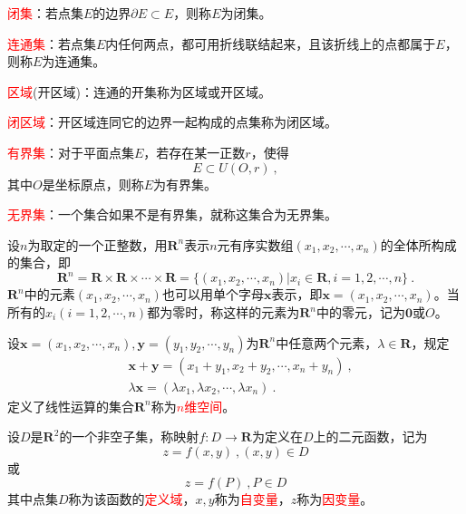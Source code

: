 \documentclass[12pt,a4paper]{article}
\renewcommand{\vec}[1]{\boldsymbol{#1}}
\begin{document}
\textcolor{red}{闭集}：若点集$E$的边界$\partial E \subset E$，则称$E$为闭集。

\textcolor{red}{连通集}：若点集$E$内任何两点，都可用折线联结起来，且该折线上的点都属于$E$，则称$E$为连通集。


\textcolor{red}{区域}(开区域)：连通的开集称为区域或开区域。

\textcolor{red}{闭区域}：开区域连同它的边界一起构成的点集称为闭区域。

\textcolor{red}{有界集}：对于平面点集$E$，若存在某一正数$r$，使得
\begin{equation*}
E \subset U(O, r) ~,
\end{equation*}
其中$O$是坐标原点，则称$E$为有界集。

\textcolor{red}{无界集}：一个集合如果不是有界集，就称这集合为无界集。

设$n$为取定的一个正整数，用$\vec{R}^n$表示$n$元有序实数组$(x_1, x_2, \cdots, x_n)$的全体所构成的集合，即
\begin{equation*}
\vec{R}^n = \vec{R} \times \vec{R} \times \cdots \times \vec{R} = \{(x_1, x_2, \cdots, x_n) | x_i \in \vec{R}, i = 1, 2, \cdots, n \} ~.
\end{equation*}
$\vec{R}^n$中的元素$(x_1, x_2, \cdots, x_n)$也可以用单个字母$\vec{x}$表示，即$\vec{x} = (x_1, x_2, \cdots, x_n)$。当所有的$x_i(i =1, 2, \cdots, n)$都为零时，称这样的元素为$\vec{R}^n$中的零元，记为$\vec{0}$或$O$。

设$\vec{x} = (x_1, x_2, \cdots, x_n), \vec{y} = (y_1, y_2, \cdots, y_n)$为$\vec{R}^n$中任意两个元素，$\lambda \in \vec{R}$，规定
\begin{align*}
& \vec{x} + \vec{y} = (x_1 +y_1, x_2 +y_2, \cdots, x_n +y_n) ~, \\
& \lambda \vec{x} =  (\lambda x_1, \lambda  x_2, \cdots, \lambda x_n) ~.
\end{align*}
定义了线性运算的集合$\vec{R}^n$称为\textcolor{red}{$n$维空间}。

\begin{tcolorbox}[colback=green!15,colframe=green!40!black,title= 定义]
设$D$是$\vec{R}^2$的一个非空子集，称映射$f : D \rightarrow \vec{R}$为定义在$D$上的二元函数，记为
\begin{equation*}
z = f(x, y) ~, (x, y) \in D
\end{equation*}
或
\begin{equation*}
z = f(P) ~, P \in D
\end{equation*}
其中点集$D$称为该函数的\textcolor{red}{定义域}，$x, y$称为\textcolor{red}{自变量}，$z$称为\textcolor{red}{因变量}。
\end{tcolorbox}
\end{document}
